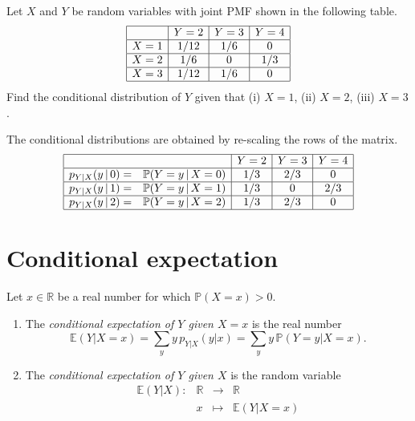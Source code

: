 \documentclass[lecture]{csm}
\newcommand{\R}{\mathbb{R}}
\newcommand{\prob}{\mathbb{P}}
\newcommand{\expe}{\mathbb{E}}
\def\it{\item}
\def\bit{\begin{itemize}}
\def\eit{\end{itemize}}
\def\ben{\begin{enumerate}}
\def\een{\end{enumerate}}
\begin{document}

\break %

\begin{example}\label{ex:tedious}
Let $X$ and $Y$ be random variables with joint PMF shown in the following table. 
\[\begin{array}{|c|c|c|c|}\hline
	& Y=2	& Y=3	& Y=4	\\ \hline
X=1	& 1/12	& 1/6	& 0 		\\ \hline
X=2	& 1/6	& 0		& 1/3 	\\ \hline
X=3	& 1/12	& 1/6  	& 0		\\ \hline
\end{array}\]
Find the conditional distribution of $Y$ given that (i) $X=1$, (ii) $X=2$, (iii) $X=3$.
\end{example}

\begin{solution}
 The conditional distributions are obtained by re-scaling the rows of the matrix.
\[\begin{array}{|cc|c|c|c|}\hline
				&			& Y=2	& Y=3	& Y=4	\\ \hline 
p_{Y|X}(y\,|\,0)	=& \prob(Y=y\,|\,X=0)	& 1/3	& 2/3	& 0		\\ \hline
p_{Y|X}(y\,|\,1)	=& \prob(Y=y\,|\,X=1)	& 1/3	& 0		& 2/3	\\ \hline
p_{Y|X}(y\,|\,2)	=& \prob(Y=y\,|\,X=2)	& 1/3	& 2/3	& 0		\\ \hline
\end{array}\]
\end{solution}

\section{Conditional expectation}
Let $x\in\R$ be a real number for which $\prob(X=x)>0$. 
\begin{definition}
\ben
\it The \emph{conditional expectation of $Y$ given $X=x$} is the real number
\[
\expe(Y|X=x) 
	= \sum_y y\,p_{Y|X}(y|x)
	= \sum_y y\,\prob(Y=y|X=x).
\]
\it The \emph{conditional expectation of $Y$ given $X$} is the random variable
\[\begin{array}{llll}
\expe(Y|X):	& \R 	& \to 		& \R \\
			& x		& \mapsto 	& \expe(Y|X=x)
\end{array}\]
\een
\end{definition}
\end{document}
